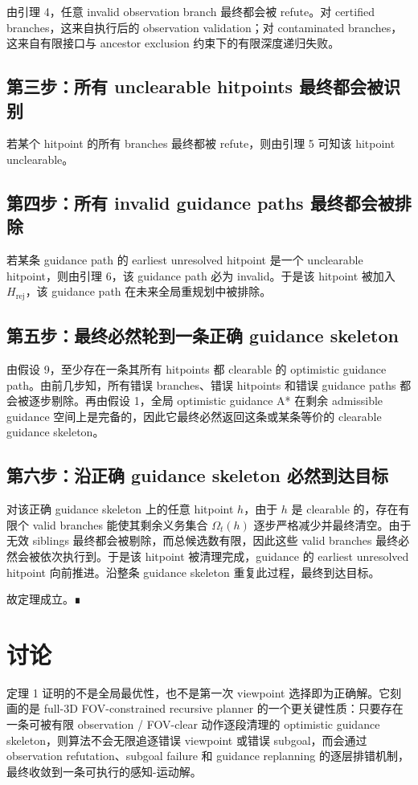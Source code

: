 \documentclass[11pt]{ctexart}
\begin{document}
由引理 4，任意 invalid observation branch 最终都会被 refute。对 certified branches，这来自执行后的 observation validation；对 contaminated branches，这来自有限接口与 ancestor exclusion 约束下的有限深度递归失败。

\subsection*{第三步：所有 unclearable hitpoints 最终都会被识别}

若某个 hitpoint 的所有 branches 最终都被 refute，则由引理 5 可知该 hitpoint unclearable。

\subsection*{第四步：所有 invalid guidance paths 最终都会被排除}

若某条 guidance path 的 earliest unresolved hitpoint 是一个 unclearable hitpoint，则由引理 6，该 guidance path 必为 invalid。于是该 hitpoint 被加入 $H_{\mathrm{rej}}$，该 guidance path 在未来全局重规划中被排除。

\subsection*{第五步：最终必然轮到一条正确 guidance skeleton}

由假设 9，至少存在一条其所有 hitpoints 都 clearable 的 optimistic guidance path。由前几步知，所有错误 branches、错误 hitpoints 和错误 guidance paths 都会被逐步剔除。再由假设 1，全局 optimistic guidance A* 在剩余 admissible guidance 空间上是完备的，因此它最终必然返回这条或某条等价的 clearable guidance skeleton。

\subsection*{第六步：沿正确 guidance skeleton 必然到达目标}

对该正确 guidance skeleton 上的任意 hitpoint $h$，由于 $h$ 是 clearable 的，存在有限个 valid branches 能使其剩余义务集合 $\Omega_t(h)$ 逐步严格减少并最终清空。由于无效 siblings 最终都会被剔除，而总候选数有限，因此这些 valid branches 最终必然会被依次执行到。于是该 hitpoint 被清理完成，guidance 的 earliest unresolved hitpoint 向前推进。沿整条 guidance skeleton 重复此过程，最终到达目标。

故定理成立。∎

\section{讨论}

定理 1 证明的不是全局最优性，也不是第一次 viewpoint 选择即为正确解。它刻画的是 full-3D FOV-constrained recursive planner 的一个更关键性质：只要存在一条可被有限 observation / FOV-clear 动作逐段清理的 optimistic guidance skeleton，则算法不会无限追逐错误 viewpoint 或错误 subgoal，而会通过 observation refutation、subgoal failure 和 guidance replanning 的逐层排错机制，最终收敛到一条可执行的感知-运动解。
\end{document}
